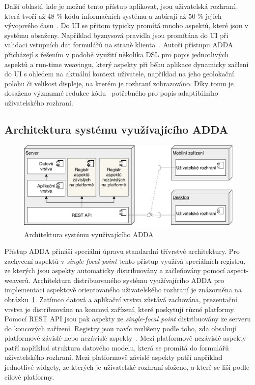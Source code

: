 Další oblastí, kde je možné tento přístup aplikovat, jsou uživatelská rozhraní,
která tvoří až 48 \% kódu informačních systému a zabírají až 50 \%
jejich vývojového času~\cite{kennard2009separation}.
Do \gls{UI} se přitom typicky promítá mnoho aspektů, které jsou
v systému obsaženy. Například byznysová pravidla jsou promítána do \gls{UI}
při validaci vstupních dat formulářů na straně klienta~\cite{cemus2017separation}.
Autoři přístupu \gls{ADDA} přicházejí s řešením v podobě
využití několika \gls{DSL} pro popis jednotlivých aspektů
a run-time weavingu, který aspekty při běhu aplikace
dynamicky začlení do \gls{UI} s ohledem na aktuální kontext
uživatele, například na jeho geolokační polohu či velikost
displeje, na kterém je rozhraní zobrazováno.
Díky tomu je dosaženo významné redukce kódu~\cite{cemus2016context}
potřebného pro popis adaptibilního uživatelského rozhraní.

\subsection{Architektura systému využívajícího ADDA}\label{sec:adda-architecture}

\begin{figure}[t]
    \centering
    \includegraphics[keepaspectratio=true, width=0.8\linewidth]{figures/adda-architecture.pdf}
    \caption{Architektura systému využívajícího ADDA}
    \label{fig:adda-architecture}
\end{figure}

Přístup \gls{ADDA} přináší speciální úpravu standardní třívrstvé architektury.
Pro zachycení aspektů v \textit{single-focal point} tento přístup využívá
speciálních registrů, ze kterých jsou aspekty automaticky distribuovány
a začleňovány pomocí aspect-weaverů. Architektura distribuovaného systému
využívajícího \gls{ADDA} pro implementaci aspektově orientovaného uživatelského rozhraní
je znázorněna na obrázku~\ref{fig:adda-architecture}. Zatímco datová a aplikační vrstva zůstává
zachována, prezentační vrstva je distribuována na koncová zařízení, které poskytují
různé platformy. Pomocí \gls{REST} \gls{API} jsou pak aspekty ze \textit{single-focal point}
distribuovány ze serveru do koncových zařízení. Registry jsou navíc
rozlišeny podle toho, zda obsahují platformově závislé nebo nezávislé aspekty~\cite{cemus2017separation}.
Mezi platformově nezávislé aspekty patří například struktura datového modelu, která se promítá
do formulářů uživatelského rozhraní. Mezi platformově závislé aspekty patří například
jednotlivé widgety, ze kterých je uživatelské rozhraní složeno, a které se liší podle cílové platformy.

